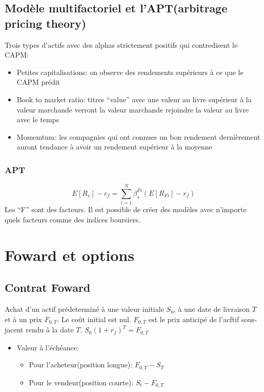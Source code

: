 \subsection*{Modèle multifactoriel et l'APT(arbitrage pricing theory)}\label{modele-multifactoriel-et-laptarbitrage-pricing-theory}

Trois types d'actifs avec des alphas strictement positifs qui
contredisent le CAPM:

\begin{itemize}

\item
  Petites capitalisations: on observe des rendements supérieurs à ce que
  le CAPM prédit
\item
  Book to market ratio: titres ``value'' avec une valeur au livre
  supérieur à la valeur marchande verront la valeur marchande rejoindre
  la valeur au livre avec le temps
\item
  Momemtum: les compagnies qui ont connues un bon rendement dernièrement
  auront tendance à avoir un rendement supérieur à la moyenne
\end{itemize}

\subsubsection*{APT}\label{apt}

\[
E[R_s]-r_f= \sum_{i=1}^N \beta_s^{Fi}(E[R_{Fi}]-r_f)
\] Les ``F'' sont des facteurs. Il est possible de créer des modèles
avec n'importe quels facteurs comme des indices boursiers.

\section{Foward et options}\label{fowardetopt}

\subsection{Contrat Foward}\label{contrat-foward}

Achat d'un actif prédeterminé à une valeur initiale \(S_0\), à une date
de livraison \(T\) et à un prix \(F_{0,T}\). Le coût initial est nul.
\(F_{0,T}\) est le prix anticipé de l'acftif sous-jacent rendu à la date
\(T\). \(S_0(1+r_f)^T=F_{0,T}\)

\begin{itemize}

\item
  Valeur à l'échéance:

  \begin{itemize}
  
  \item
    Pour l'acheteur(position longue): \(F_{0,T} - S_T\)
  \item
    Pour le vendeur(position courte): \(S_t - F_{0,T}\)
  \end{itemize}
\end{itemize}


